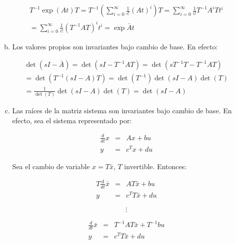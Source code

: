 \begin{enumerate}[i)]
\begin{enumerate}[a)]
                \begin{multline}
                    T^{-1} \exp{(At)} T = T^{-1} \left( \sum\limits_{i=0}^{\infty} \frac{1}{i!} (A t)^i \right) T = \sum\limits_{i=0}^{\infty} \frac{1}{i!} T^{-1} A^i T t^i \\
                    = \sum\limits_{i=0}^{\infty} \frac{1}{i!} (T^{-1} A T)^i t^i = \exp{\bar{A} t} \nonumber
                \end{multline}

                \item Los valores propios son invariantes bajo cambio de base. En efecto:

                \begin{multline}
                    \det{(sI - \bar{A})} = \det{(sI - T^{-1} A T)} = \det{(s T^{-1} T - T^{-1} A T)} \\
                    = \det{(T^{-1} (sI - A) T)} = \det{(T^{-1})} \det{(sI - A)} \det{(T)} \\
                    = \frac{1}{\det{(T)}} \det{(sI - A)} \det{(T)} = \det{(sI - A)} \nonumber
                \end{multline}

                \item Las raíces de la matriz sistema son invariantes bajo cambio de base. En efecto, sea el sistema representado por:

                \begin{eqnarray}
                \frac{d}{dt} x & = & A x + b u \nonumber \\
                y & = & c^T x + d u \nonumber
                \end{eqnarray}

                Sea el cambio de variable $x = T \bar{x}$, $T$ invertible. Entonces:

                \begin{eqnarray}
                T \frac{d}{dt} \bar{x} & = & A T \bar{x} + b u \nonumber \\
                y & = & c^T T \bar{x} + d u \nonumber
                \end{eqnarray}

                \begin{equation}
                    \vdots \nonumber
                \end{equation}

                \begin{eqnarray}
                \frac{d}{dt} \bar{x} & = & T^{-1} A T \bar{x} + T^{-1} b u \nonumber \\
                y & = & c^T T \bar{x} + d u \nonumber
                \end{eqnarray}


\end{enumerate}
\end{enumerate}
